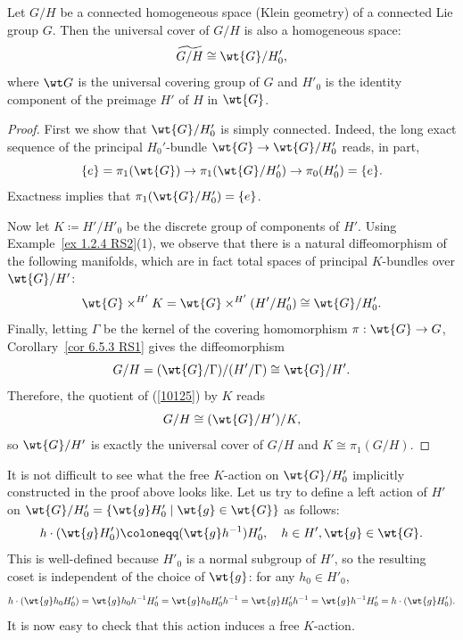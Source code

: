 \begin{lem}\label{lem univ cov hom space}
    Let $G\slash H$ be a connected homogeneous space (Klein geometry) of a connected Lie group $G$. Then the universal cover of $G\slash H$ is also a homogeneous space:
    \[\widetilde{G\slash H}\cong \wt{G}\slash H'_0,\]
    where $\wt G$ is the universal covering group of $G$ and $H'_0$ is the identity component of the preimage $H'$ of $H$ in $\wt{G}$.
\end{lem}
\begin{proof}
    First we show that $\wt{G}\slash H'_0$ is simply connected. Indeed, the long exact sequence of the principal $H_0'$-bundle $\wt{G}\to \wt{G}\slash H'_0$ reads, in part,
    \[\{e\}=\pi_1(\wt{G})\to \pi_1(\wt{G}\slash H_0')\to \pi_0(H_0')=\{e\}.\]
    Exactness implies that $\pi_1(\wt{G}\slash H_0')=\{e\}$.

    Now let $K\coloneqq H'\slash H'_0$ be the discrete group of components of $H'$. Using Example~\ref{ex 1.2.4 RS2}(1), we observe that there is a natural diffeomorphism of the following manifolds, which are in fact total spaces of principal $K$-bundles over $\wt{G}\slash H'$:
    \[\wt{G}\times^{H'}K=\wt{G}\times^{H'}(H'\slash H'_0)\cong \wt{G}\slash H'_0.\label{10125}\]
    Finally, letting $\Gamma$ be the kernel of the covering homomorphism $\pi:\wt{G}\to G$, Corollary~\ref{cor 6.5.3 RS1} gives the diffeomorphism
    \[G\slash H=(\wt{G}\slash \Gamma)\slash (H'\slash \Gamma)\cong \wt{G}\slash H'.\]
    Therefore, the quotient of (\ref{10125}) by $K$ reads
    \[G\slash H\cong (\wt{G}\slash H')\slash K,\]
    so $\wt{G}\slash H'$ is exactly the universal cover of $G\slash H$ and $K\cong \pi_1(G\slash H)$.
\end{proof}
\begin{rem}
    It is not difficult to see what the free $K$-action on $\wt{G}\slash H'_0$ implicitly constructed in the proof above  looks like. Let us try to define a left action of $H'$ on $\wt{G}\slash H'_0=\{\wt{g}H'_0\mid \wt{g}\in\wt{G}\}$ as follows:
    \[h\cdot (\wt{g} H'_0)\coloneqq (\wt{g}h^{-1})H'_0,\quad h\in H',\wt{g}\in \wt{G}.\]
    This is well-defined because $H'_0$ is a normal subgroup of $H'$, so the resulting coset is independent of the choice of $\wt{g}$: for any $h_0\in H'_0$,
    \[h\cdot (\wt{g}h_0H'_0)=\wt{g}h_0 h^{-1}H'_0=\wt{g}h_0H'_0h^{-1}=\wt{g}H'_0h^{-1}=\wt{g}h^{-1}H'_0=h\cdot (\wt{g}H'_0).\]
    It is now easy to check that this action induces a free $K$-action.
\end{rem}

